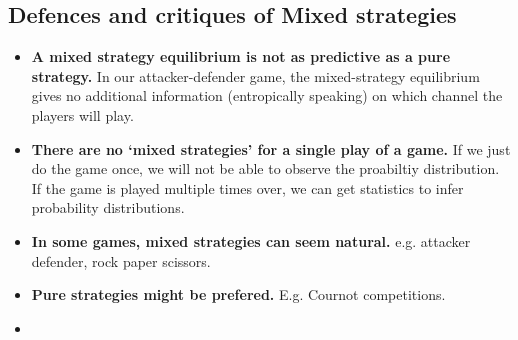 \subsection*{Defences and critiques of Mixed strategies}
\begin{itemize}
    \item \textbf{A mixed strategy equilibrium is not as predictive as a pure strategy.} In our attacker-defender game, the mixed-strategy equilibrium gives no additional information (entropically speaking) on which channel the players will play. 
    \item \textbf{There are no `mixed strategies' for a single play of a game.} If we just do the game once, we will not be able to observe the proabiltiy distribution. If the game is played multiple times over, we can get statistics to infer probability distributions. 
    \item \textbf{In some games, mixed strategies can seem natural.} e.g. attacker defender, rock paper scissors. 
    \item \textbf{Pure strategies might be prefered.} E.g. Cournot competitions.
    \item 
\end{itemize}